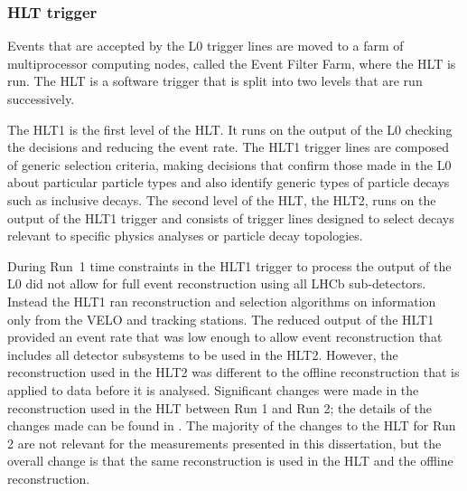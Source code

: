 \subsubsection{HLT trigger}
\label{HLT}

Events that are accepted by the L0 trigger lines are moved to a farm of multiprocessor computing nodes, called the Event Filter Farm, where the HLT is run. The HLT is a software trigger that is split into two levels that are run successively. 

The HLT1 is the first level of the HLT. It runs on the output of the L0 checking the decisions and reducing the event rate. %
The HLT1 trigger lines are composed of generic selection criteria, making decisions that confirm those made in the L0 about particular particle types and also identify generic types of particle decays such as inclusive \bhadron decays. 
The second level of the HLT, the HLT2, runs on the output of the HLT1 trigger and consists of trigger lines designed to select decays relevant to specific physics analyses or particle decay topologies.




During Run~1 time constraints in the HLT1 trigger to process the output of the L0 did not allow for full event reconstruction using all LHCb sub-detectors. Instead the HLT1 ran reconstruction and selection algorithms on information only from the VELO and tracking stations. The reduced output of the HLT1 provided an event rate that was low enough to allow event reconstruction that includes all detector subsystems to be used in the HLT2. However, the reconstruction used in the HLT2 was different to the offline reconstruction that is applied to data before it is analysed. Significant changes were made in the reconstruction used in the HLT between Run 1 and Run 2; the details of the changes made can be found in \cite{Lupton:2230910}. The majority of the changes to the HLT for Run 2 are not relevant for the measurements presented in this dissertation, but the overall change is that the same reconstruction is used in the HLT and the offline reconstruction. 


